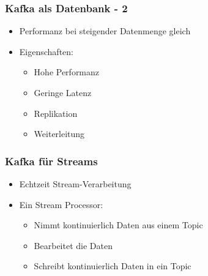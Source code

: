 \begin{frame}
\frametitle{Kafka als Datenbank - 2}

\begin{itemize}
	\item Performanz bei steigender Datenmenge gleich
	\item Eigenschaften:
	\begin{itemize}
		\item Hohe Performanz
		\item Geringe Latenz %
		\item Replikation
		\item Weiterleitung %
	\end{itemize}
\end{itemize}

\end{frame}

\begin{frame}
\frametitle{Kafka für Streams}

\begin{itemize}
	\item Echtzeit Stream-Verarbeitung
	\item Ein Stream Processor:
	\begin{itemize}
		\item Nimmt kontinuierlich Daten aus einem Topic   %
		\item Bearbeitet die Daten %
		\item Schreibt kontinuierlich Daten in ein Topic %
	\end{itemize}
\end{itemize}

\end{frame}


